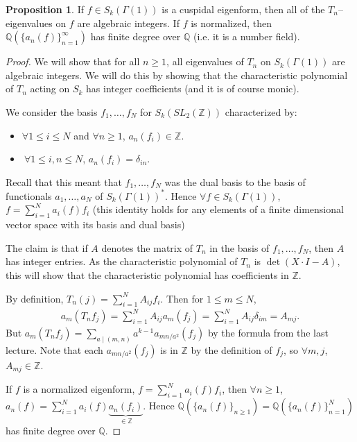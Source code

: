 \documentclass{article}
\theoremstyle{definition}
\newtheorem{prop}[theorem]{Proposition}
\begin{document}
\begin{prop}
    If $f \in S_k(\Gamma(1))$ is a cuspidal eigenform, then all of the $T_n$--eigenvalues on $f$ are algebraic integers. If $f$ is normalized, then $\mathbb{Q}(\{a_n(f)\}_{n=1}^{\infty})$ has finite degree over $\mathbb{Q}$ (i.e. it is a number field).
\end{prop}
\begin{proof}
    We will show that for all $n\ge 1$, all eigenvalues of $T_n$ on $S_k(\Gamma(1))$ are algebraic integers. We will do this by showing that the characteristic polynomial of $T_n$ acting on $S_k$ has integer coefficients (and it is of course monic).
    \vspace{1mm}
     
    We consider the basis $f_1,\ldots,f_N$ for $S_k(SL_{2}(\mathbb{Z}))$ characterized by:
    \begin{itemize}
        \item $\forall 1\le i \le N$ and $\forall  n\ge 1$, $a_n(f_i) \in \mathbb{Z}$.
        \item $~\forall 1\le i, n \le N$, $a_n(f_i) = \delta_{in}$.
    \end{itemize}
    Recall that this meant that $f_1,\ldots,f_N$ was the dual basis to the basis of functionals $a_1,\ldots,a_N$ of $S_k(\Gamma(1))^{*}$. Hence $\forall f \in S_k(\Gamma(1))$, $f = \sum_{i=1}^{N} a_i(f)f_i$ (this identity holds for any elements of a finite dimensional vector space with its basis and dual basis)
    \vspace{1mm}
     
    The claim is that if $A$ denotes the matrix of $T_n$ in the basis of $f_1,\ldots,f_N$, then $A$ has integer entries. As the characteristic polynomial of $T_n$ is $\det(X\cdot I - A)$, this will show that the characteristic polynomial has coefficients in $\mathbb{Z}$.
    \vspace{1mm}
     
    By definition, $T_n(j) = \sum_{i=1}^{N} A_{ij}f_i$. Then for $1\le m\le N$, 
    \begin{align*}
        a_m (T_n f_j) = \sum_{i=1}^{N} A_{ij} a_m(f_j) = \sum_{i=1}^{N} A_{ij}\delta_{im} = A_{mj}.
    \end{align*}
    But $a_m(T_n f_j) = \sum_{a \mid (m,n)}^{} a^{k-1}a_{mn/a^2}(f_j)$ by the formula from the last lecture. Note that each $a_{mn/a^2}(f_j)$ is in $\mathbb{Z}$ by the definition of $f_j$, so $\forall m, j$, $A_{mj} \in \mathbb{Z}$.
    \vspace{1mm}
     
    If $f$ is a normalized eigenform, $f = \sum_{i=1}^{N} a_i(f)f_i$, then $\forall n\ge1$, $a_n(f) = \sum_{i=1}^{N} a_i(f)\underbrace{a_{n}(f_i)}_{\in \mathbb{Z}}$. Hence $\mathbb{Q}(\{a_n(f)\}_{n\ge 1}) = \mathbb{Q}(\{a_n(f)\}_{n=1}^N)$ has finite degree over $\mathbb{Q}$.
\end{proof}
\end{document}
